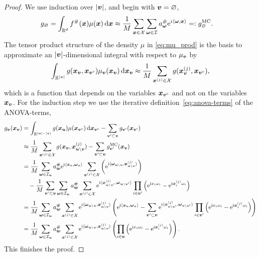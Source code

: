 \documentclass{article}
\renewcommand{\vec}[1]{\ensuremath \mathbf{\boldsymbol{#1}}}
\newcommand{\X}{\ensuremath{\mathcal{X}}}
\newcommand{\w}{\ensuremath{\vec \omega}}
\newcommand{\x}{\ensuremath{\vec x}}
\newcommand{\I}{\ensuremath{\mathcal{I}}}
\newcommand{\R}{\ensuremath{\mathbb{R}}}
\newcommand{\e}{\mathrm{e}}
\newcommand{\im}{\mathrm{i}}
\renewcommand{\d}{\, \mathrm{d}}
\theoremstyle{definition}
\numberwithin{equation}{section}
\begin{document}
\begin{proof}
We use induction over $|\vec v|$, and begin with $\vec v = \varnothing$,
\begin{align*}
g_{\varnothing} &= \int_{\R^d}  f^\#(\vec x) \mu(\x) \d \x \approx \frac{1}{M}\sum_{\vec x\in \X} \sum_{\w\in \I} a^{ \#}_{\w} \e^{i\langle\w,\x\rangle } =: g^{\text{MC}}_{\varnothing}.
\end{align*}
The tensor product structure of the density $\mu$ in \eqref{eq:mu_prod} is the basis to approximate an $|\vec v|$-dimensional integral with respect to $\mu_{\vec v}$ by
$$\int_{\R^{|\vec v|}}g(\vec x_{\vec v},\vec x_{\vec v^c} ) \mu_{\vec v}(\vec x_{\vec v})\d \vec x_{\vec v}
\approx \frac 1M \sum_{\x^{(j)}\in \X} g(\vec x^{(j)}_{\vec v},\vec x_{\vec v^c}  ), $$
which is a function that depends on the variables $\x_{\vec v^c}$ and not on the variables $\x_{\vec v}$. 
For the induction step we use the iterative definition~\eqref{eq:anova-terms} of the ANOVA-terms,
\begin{align*}
g_{\vec v}(\vec x_{\vec v})&=\int_{\R^{|\vec u|-|\vec v|}}g(\vec x_{\vec u}) \mu(\vec x_{\vec v^c})\d \vec x_{\vec v^c}-\sum_{\vec v'\subset \vec v}g_{\vec v'}(\vec x_{\vec v'})\\
&\approx \frac 1M \sum_{\vec x^{(j)}\in \X}  g(\vec x_{\vec v},\vec x^{(j)}_{\vec u\backslash \vec v}) - \sum_{\vec v'\subset \vec v} g^{\text{MC}}_{\vec v'}(\vec x_{\vec v})\\
&= \frac 1M  \sum_{\w\in \I_{\vec u}}  a^{ \#}_{\vec w} \e^{\im \langle\vec x_{\vec v},\w_{\vec v}\rangle} \sum_{\vec x^{(j)}\in \X} \left( \e^{\im \langle\w_{\vec u\backslash \vec v}, \x^{(j)}_{\vec u\backslash \vec v}\rangle}\right) \\
&\quad -  \frac 1M \sum_{\vec v'\subset \vec v} \sum_{\w \in \I_{\vec u}}a^{ \#}_{\vec w}  \sum_{\x^{(j)} \in \X} \e^{\im \langle \vec x^{(j)}_{\vec u\backslash \vec v'}, \w_{\vec u\backslash \vec v'}\rangle} \prod_{i\in \vec v'} \left(\e^{\im x_i\omega_i} - \e^{\im \vec x_{i}^{(j)}\omega_i}\right)\\
 &= \frac 1M  \sum_{\w\in \I_{\vec u}} a^{ \#}_{\vec w} \sum_{\vec x^{(j)}\in \X} \e^{\im \langle\w_{\vec u\backslash \vec v}, \x^{(j)}_{\vec u\backslash \vec v}\rangle}  \left(  \e^{\im \langle\vec x_{\vec v},\w_{\vec v}\rangle}   - \sum_{\vec v'\subset \vec v}  \e^{\im \langle \vec x^{(j)}_{\vec v\backslash \vec v'}, \w_{\vec v\backslash \vec v'}\rangle} \prod_{i\in \vec v'} \left(\e^{\im x_i\omega_i} - \e^{\im \vec x_{i}^{(j)}\omega_i}\right)\right)\\
 &= \frac 1M  \sum_{\w\in \I_{\vec u}} a^{ \#}_{\vec w} \sum_{\vec x^{(j)}\in \X} \e^{\im \langle\w_{\vec u\backslash \vec v}, \x^{(j)}_{\vec u\backslash \vec v}\rangle}  \left(   \prod_{i\in \vec v} \left(\e^{\im x_i\omega_i} - \e^{\im \vec x_{i}^{(j)}\omega_i}\right)\right).
\end{align*}
This finishes the proof.
\end{proof}
\end{document}
